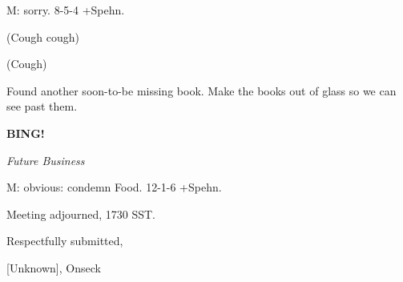 \documentclass[12pt]{article}
\newcommand{\bing}{{\bf BING!} }
\newcommand{\goto}[1]{\bing \vskip 12pt \centerline{{\em{#1}}}}
\begin{document}
M: sorry. 8-5-4 +Spehn.

(Cough cough)

(Cough)

Found another soon-to-be missing book. Make the books out of glass so we can see past them.

\goto{Future Business}

M: obvious: condemn Food. 12-1-6 +Spehn.

\vspace{12pt}

\noindent
Meeting adjourned, 1730 SST.

\vspace{18pt}

\centerline{Respectfully submitted,}
\centerline{[Unknown], Onseck}
\end{document}
